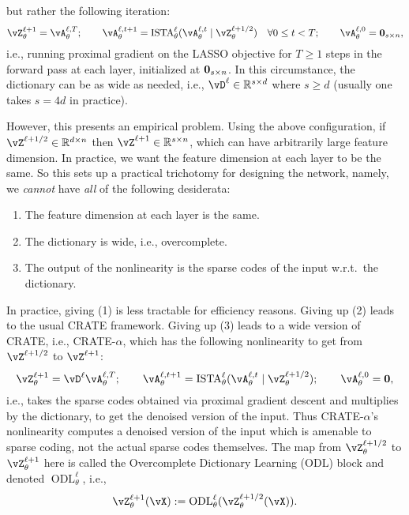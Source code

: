 \documentclass[\toplevelprefix/book-main.tex]{subfiles}
\begin{document}
but rather the following iteration:
\begin{equation}
    \vZ_{\theta}^{\ell + 1} = \vA_{\theta}^{\ell, T}; \qquad \vA_{\theta}^{\ell, t + 1} = \ISTA_{\theta}^{\ell}(\vA_{\theta}^{\ell, t} \mid \vZ_{\theta}^{\ell + 1/2}) \quad \forall 0 \leq t < T; \qquad \vA_{\theta}^{\ell, 0} = \vzero_{s \times n},
\end{equation}
i.e., running proximal gradient on the LASSO objective for \(T \geq 1\) steps in the forward pass at each layer, initialized at \(\bm{0}_{s \times n}\). In this circumstance, the dictionary can be as wide as needed, i.e., \(\vD^{\ell} \in \R^{s \times d}\) where \(s \geq d\) (usually one takes \(s = 4d\) in practice). 

However, this presents an empirical problem. Using the above configuration, if \(\vZ^{\ell + 1/2} \in \R^{d \times n}\) then \(\vZ^{\ell + 1} \in \R^{s \times n}\), which can have arbitrarily large feature dimension. In practice, we want the feature dimension at each layer to be the same. So this sets up a practical trichotomy for designing the network, namely, we \textit{cannot} have \textit{all} of the following desiderata:
\begin{enumerate}
    \item The feature dimension at each layer is the same.
    \item The dictionary is wide, i.e., overcomplete.
    \item The output of the nonlinearity is the sparse codes of the input w.r.t.~the dictionary.
\end{enumerate}
In practice, giving (1) is less tractable for efficiency reasons. Giving up (2) leads to the usual CRATE framework. Giving up (3) leads to a wide version of CRATE, i.e., CRATE-\(\alpha\), which has the following nonlinearity to get from \(\vZ^{\ell + 1/2}\) to \(\vZ^{\ell + 1}\):
\begin{equation}
    \vZ_{\theta}^{\ell + 1} = \vD^{\ell}\vA_{\theta}^{\ell, T}; \qquad \vA_{\theta}^{\ell, t + 1} = \ISTA_{\theta}^{\ell}(\vA_{\theta}^{\ell, t} \mid \vZ_{\theta}^{\ell + 1/2}); \qquad \vA_{\theta}^{\ell, 0} = \vzero,
\end{equation}
i.e., takes the sparse codes obtained via proximal gradient descent and multiplies by the dictionary, to get the denoised version of the input. Thus CRATE-\(\alpha\)'s nonlinearity computes a denoised version of the input which is amenable to sparse coding, not the actual sparse codes themselves. The map from \(\vZ_{\theta}^{\ell + 1/2}\) to \(\vZ_{\theta}^{\ell + 1}\) here is called the Overcomplete Dictionary Learning (ODL) block and denoted \(\operatorname{ODL}_{\theta}^{\ell}\), i.e.,
\begin{equation}
    \vZ_{\theta}^{\ell + 1}(\vX) := \operatorname{ODL}_{\theta}^{\ell}(\vZ_{\theta}^{\ell + 1/2}(\vX)).
\end{equation}
\end{document}
